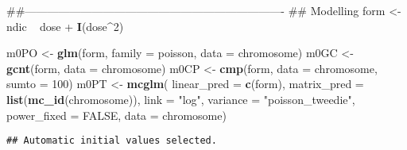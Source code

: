 \documentclass[9pt,a5paper,]{book}
\newenvironment{Shaded}{}{}
\newcommand{\KeywordTok}[1]{\textbf{{#1}}}
\newcommand{\DataTypeTok}[1]{\underline{{#1}}}
\newcommand{\DecValTok}[1]{{#1}}
\newcommand{\StringTok}[1]{{#1}}
\newcommand{\OtherTok}[1]{{#1}}
\newcommand{\NormalTok}[1]{{#1}}
\renewenvironment{Shaded}{\color{inputcolor}}{}
\renewcommand{\DataTypeTok}[1]{{#1}}
\theoremstyle{definition}
\theoremstyle{definition}
\theoremstyle{remark}
\begin{document}
\begin{Shaded}
\begin{Highlighting}[]
\NormalTok{##----------------------------------------------------------------------}
\NormalTok{## Modelling}
\NormalTok{form <-}\StringTok{ }\NormalTok{ndic ~}\StringTok{ }\NormalTok{dose +}\StringTok{ }\KeywordTok{I}\NormalTok{(dose^}\DecValTok{2}\NormalTok{)}

\NormalTok{m0PO <-}\StringTok{ }\KeywordTok{glm}\NormalTok{(form, }\DataTypeTok{family =} \NormalTok{poisson, }\DataTypeTok{data =} \NormalTok{chromosome)}
\NormalTok{m0GC <-}\StringTok{ }\KeywordTok{gcnt}\NormalTok{(form, }\DataTypeTok{data =} \NormalTok{chromosome)}
\NormalTok{m0CP <-}\StringTok{ }\KeywordTok{cmp}\NormalTok{(form, }\DataTypeTok{data =} \NormalTok{chromosome, }\DataTypeTok{sumto =} \DecValTok{100}\NormalTok{)}
\NormalTok{m0PT <-}\StringTok{ }\KeywordTok{mcglm}\NormalTok{(}
    \DataTypeTok{linear_pred =} \KeywordTok{c}\NormalTok{(form),}
    \DataTypeTok{matrix_pred =} \KeywordTok{list}\NormalTok{(}\KeywordTok{mc_id}\NormalTok{(chromosome)),}
    \DataTypeTok{link =} \StringTok{"log"}\NormalTok{,}
    \DataTypeTok{variance =} \StringTok{"poisson_tweedie"}\NormalTok{,}
    \DataTypeTok{power_fixed =} \OtherTok{FALSE}\NormalTok{,}
    \DataTypeTok{data =} \NormalTok{chromosome)}
\end{Highlighting}
\end{Shaded}

\begin{verbatim}
## Automatic initial values selected.
\end{verbatim}
\end{document}
